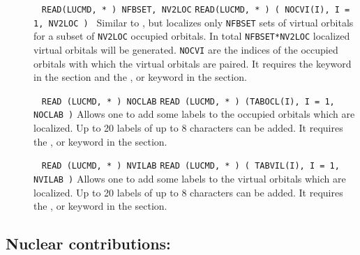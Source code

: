\begin{description}
\item []\verb| |\newline
 \verb|READ(LUCMD, * ) NFBSET, NV2LOC|\newline
 \verb|READ(LUCMD, * ) ( NOCVI(I), I = 1, NV2LOC ) |\newline
Similar to , but localizes only \verb|NFBSET| sets of
virtual orbitals for a subset of \verb|NV2LOC| occupied orbitals. In
total \verb|NFBSET*NV2LOC| localized virtual orbitals will be
generated. \verb|NOCVI| are the indices of the occupied orbitals with
which the virtual orbitals are paired. It requires the 
keyword in the  section and the , 
or  keyword in the  section.

\item []\verb| |\newline
 \verb|READ (LUCMD, * ) NOCLAB|\newline
 \verb|READ (LUCMD, * ) (TABOCL(I), I = 1, NOCLAB )|\newline
Allows one to add some labels to the occupied orbitals which are
localized. Up to 20 labels of up to 8 characters can be added. It
requires the ,  or  
keyword in the  section.

\item []\verb| |\newline
 \verb|READ (LUCMD, * ) NVILAB|\newline
 \verb|READ (LUCMD, * ) ( TABVIL(I), I = 1, NVILAB )|\newline
Allows one to add some labels to the virtual orbitals which are
localized. Up to 20 labels of up to 8 characters can be added. It
requires the ,  or  keyword in the
 section.

\end{description}



\subsection{Nuclear contributions: }

